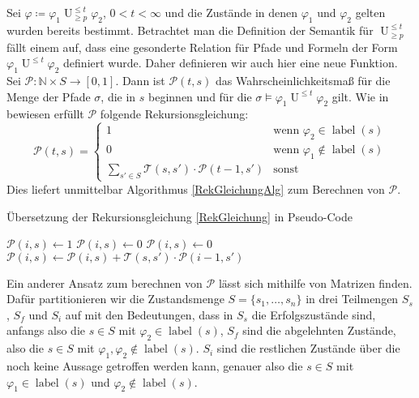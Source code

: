 \documentclass{lni}
\theoremstyle{def_style}
\theoremstyle{break}
\newcommand{\UEqual}[4]{#1\operatorname{U}^{\leq #2}_{\geq #3}#4}
\begin{document}
Sei $\varphi \coloneqq \UEqual{\varphi_1}{t}{p}{\varphi_2}$, $0<t<\infty$ und die Zustände in denen $\varphi_1$ und $\varphi_2$ gelten wurden bereits bestimmt. 
Betrachtet man die Definition der Semantik für $\UEqual{}{t}{p}{}$ fällt einem auf, dass eine gesonderte Relation für Pfade und Formeln der Form $\varphi_1 \operatorname{U}^{\leq t} \varphi_2$ definiert wurde. 
Daher definieren wir auch hier eine neue Funktion. 
Sei $\mathcal{P}:\mathbb{N}\times S \to [0,1]$. 
Dann ist $\mathcal{P}(t,s)$ das Wahrscheinlichkeitsmaß für die Menge der Pfade $\sigma$, die in $s$ beginnen und für die $\sigma\models \varphi_1 \operatorname{U}^{\leq t} \varphi_2$ gilt. 
Wie in \cite{hansson1994logic} bewiesen erfüllt $\mathcal{P}$ folgende Rekursionsgleichung:
\begin{equation}
	\mathcal{P}(t,s) = 
	\begin{cases}
		1 & \text{wenn } \varphi_2\in \operatorname{label}(s) \\
		0 & \text{wenn } \varphi_1 \notin \operatorname{label}(s) \\
		\sum_{s'\in S} \mathcal{T}(s,s')\cdot \mathcal{P}(t-1,s') & \text{sonst}
	\end{cases}
	\label{RekGleichung}
\end{equation}
Dies liefert unmittelbar Algorithmus \ref{RekGleichungAlg} zum Berechnen von $\mathcal{P}$.

\begin{algorithm}[h]
	\caption{Übersetzung der Rekursionsgleichung \ref{RekGleichung} in Pseudo-Code \cite{hansson1994logic}}
	\label{RekGleichungAlg}
	\begin{algorithmic}
					\State $\mathcal{P}(i,s) \gets 1$
					\State $\mathcal{P}(i,s) \gets 0$
				\Else
					\State $\mathcal{P}(i,s)\gets 0$
						\State $\mathcal{P}(i,s)\gets \mathcal{P}(i,s)+\mathcal{T}(s,s')\cdot \mathcal{P}(i-1,s')$
					\EndFor
				\EndIf
			\EndFor
		\EndFor
	\end{algorithmic}
\end{algorithm}

Ein anderer Ansatz zum berechnen von $\mathcal{P}$ lässt sich mithilfe von Matrizen finden. Dafür partitionieren wir die Zustandsmenge $S=\{s_1,\dots,s_n\}$ in drei Teilmengen $S_s$, $S_f$ und $S_i$ auf mit den Bedeutungen, dass in $S_s$ die Erfolgszustände sind, anfangs also die $s\in S$ mit $\varphi_2\in \operatorname{label}(s)$, $S_f$ sind die abgelehnten Zustände, also die $s\in S$ mit $\varphi_1,\varphi_2 \notin \operatorname{label}(s)$. $S_i$ sind die restlichen Zustände über die noch keine Aussage getroffen werden kann, genauer also die $s\in S$ mit $\varphi_1\in \operatorname{label}(s)$ und $\varphi_2\notin \operatorname{label}(s)$. \cite{hansson1994logic}
\end{document}

